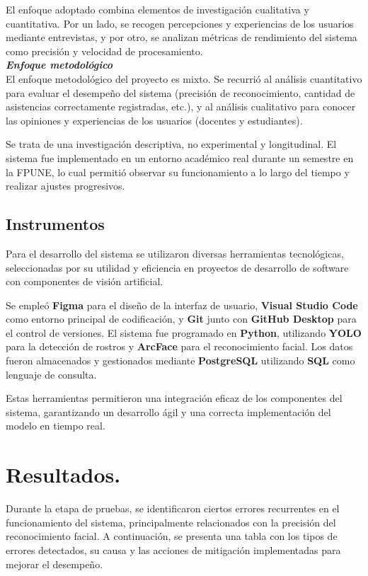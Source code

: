 \documentclass[10pt,a4paper]{article}
\begin{document}
\begin{multicols}{2}
El enfoque adoptado combina elementos de investigación cualitativa y cuantitativa. Por un lado, se recogen percepciones y experiencias de los usuarios mediante entrevistas, y por otro, se analizan métricas de rendimiento del sistema como precisión y velocidad de procesamiento.\\

\textbf{\textit{Enfoque metodológico}}\\
El enfoque metodológico del proyecto es mixto. Se recurrió al análisis cuantitativo para evaluar el desempeño del sistema (precisión de reconocimiento, cantidad de asistencias correctamente registradas, etc.), y al análisis cualitativo para conocer las opiniones y experiencias de los usuarios (docentes y estudiantes).

Se trata de una investigación descriptiva, no experimental y longitudinal. El sistema fue implementado en un entorno académico real durante un semestre en la FPUNE, lo cual permitió observar su funcionamiento a lo largo del tiempo y realizar ajustes progresivos.


\subsection{Instrumentos}

Para el desarrollo del sistema se utilizaron diversas herramientas tecnológicas, seleccionadas por su utilidad y eficiencia en proyectos de desarrollo de software con componentes de visión artificial.

Se empleó \textbf{Figma} para el diseño de la interfaz de usuario, \textbf{Visual Studio Code} como entorno principal de codificación, y \textbf{Git} junto con \textbf{GitHub Desktop} para el control de versiones. El sistema fue programado en \textbf{Python}, utilizando \textbf{YOLO} para la detección de rostros y \textbf{ArcFace} para el reconocimiento facial. Los datos fueron almacenados y gestionados mediante \textbf{PostgreSQL} utilizando \textbf{SQL} como lenguaje de consulta.

Estas herramientas permitieron una integración eficaz de los componentes del sistema, garantizando un desarrollo ágil y una correcta implementación del modelo en tiempo real.


\section{Resultados.}

Durante la etapa de pruebas, se identificaron ciertos errores recurrentes en el funcionamiento del sistema, principalmente relacionados con la precisión del reconocimiento facial. A continuación, se presenta una tabla con los tipos de errores detectados, su causa y las acciones de mitigación implementadas para mejorar el desempeño.


\end{multicols}
\end{document}

